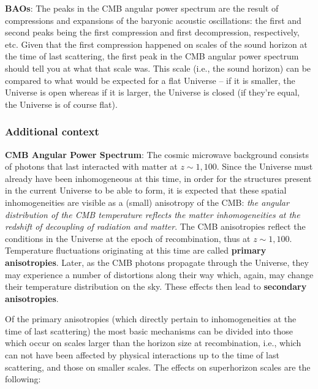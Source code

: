 \documentclass[a4paper,11pt]{article}
\begin{document}
{\noindent}\textbf{BAOs}: The peaks in the CMB angular power spectrum are the result of compressions and expansions of the baryonic acoustic oscillations: the first and second peaks being the first compression and first decompression, respectively, etc. Given that the first compression happened on scales of the sound horizon at the time of last scattering, the first peak in the CMB angular power spectrum should tell you at what that scale was. This scale (i.e., the sound horizon) can be compared to what would be expected for a flat Universe -- if it is smaller, the Universe is open whereas if it is larger, the Universe is closed (if they're equal, the Universe is of course flat).

\subsubsection{Additional context}

\textbf{CMB Angular Power Spectrum}: The cosmic microwave background consists of photons that last interacted with matter at $z\sim1,100$. Since the Universe must already have been inhomogeneous at this time, in order for the structures present in the current Universe to be able to form, it is expected that these spatial inhomogeneities are visible as a (small) anisotropy of the CMB: \textit{the angular distribution of the CMB temperature reflects the matter inhomogeneities at the redshift of decoupling of radiation and matter}. The CMB anisotropies reflect the conditions in the Universe at the epoch of recombination, thus at $z\sim1,100$. Temperature fluctuations originating at this time are called \textbf{primary anisotropies}. Later, as the CMB photons propagate through the Universe, they may experience a number of distortions along their way which, again, may change their temperature distribution on the sky. These effects then lead to \textbf{secondary anisotropies}.

{\noindent}Of the primary anisotropies (which directly pertain to inhomogeneities at the time of last scattering) the most basic mechanisms can be divided into those which occur on scales larger than the horizon size at recombination, i.e., which can not have been affected by physical interactions up to the time of last scattering, and those on smaller scales. The effects on superhorizon scales are the following:
\end{document}
